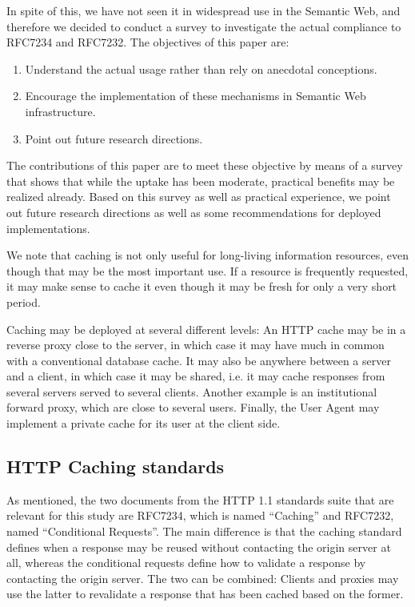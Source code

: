 \documentclass{llncs}
\begin{document}
In spite of this, we have not seen it in widespread use in the
Semantic Web, and therefore we decided to conduct a survey to
investigate the actual compliance to RFC7234 and RFC7232. 
The objectives of this paper are:
\begin{enumerate}
\item Understand the actual usage rather than rely on anecdotal
  conceptions.
\item Encourage the implementation of these mechanisms in Semantic Web
  infrastructure.
\item Point out future research directions.
\end{enumerate}
The contributions of this paper are to meet these objective by means
of a survey that shows that while the uptake has been moderate,
practical benefits may be realized already. Based on this survey as
well as practical experience, we point out future research directions
as well as some recommendations for deployed implementations.


We note that caching is not only useful for long-living information
resources, even though that may be the most important use. If a resource
is frequently requested, it may make sense to cache it even though it
may be fresh for only a very short period.

Caching may be deployed at several different levels: An HTTP cache may
be in a reverse proxy close to the server, in which case it may have
much in common with a conventional database cache. It may also be
anywhere between a server and a client, in which case it may be
shared, i.e. it may cache responses from several servers served to
several clients. Another example is an institutional forward proxy,
which are close to several users. Finally, the User Agent may
implement a private cache for its user at the client side.


\subsection{HTTP Caching standards}

As mentioned, the two documents from the HTTP 1.1 standards suite that
are relevant for this study are RFC7234, which is named ``Caching''
and RFC7232, named ``Conditional Requests''. The main difference is
that the caching standard defines when a response may be reused
without contacting the origin server at all, whereas the conditional
requests define how to validate a response by contacting the origin
server. The two can be combined: Clients and proxies may use the
latter to revalidate a response that has been cached based on the
former.
\end{document}
